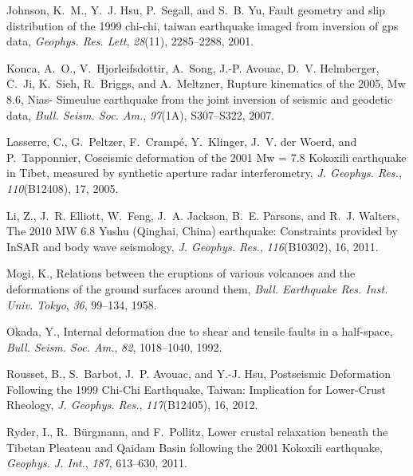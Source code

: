\documentclass[10pt]{article}
\begin{document}
\begin{thebibliography}{30}
Johnson, K.~M., Y.~J. Hsu, P.~Segall, and S.~B. Yu, Fault geometry and slip
  distribution of the 1999 chi-chi, taiwan earthquake imaged from inversion of
  gps data, \textit{Geophys. Res. Lett}, \textit{28}(11), 2285--2288, 2001.

Konca, A.~O., V.~Hjorleifsdottir, A.~Song, J.-P. Avouac, D.~V. Helmberger,
  C.~Ji, K.~Sieh, R.~Briggs, and A.~Meltzner, {Rupture kinematics of the 2005,
  Mw 8.6, Nias- Simeulue earthquake from the joint inversion of seismic and
  geodetic data}, \textit{Bull. Seism. Soc. Am.}, \textit{97}(1A), S307--S322,
  2007.

Lasserre, C., G.~Peltzer, F.~Cramp\'{e}, Y.~Klinger, J.~V. der Woerd, and
  P.~Tapponnier, {Coseismic deformation of the 2001 Mw = 7.8 Kokoxili
  earthquake in Tibet, measured by synthetic aperture radar interferometry},
  \textit{J. Geophys. Res.}, \textit{110}(B12408), 17, 2005.

Li, Z., J.~R. Elliott, W.~Feng, J.~A. Jackson, B.~E. Parsons, and R.~J.
  Walters, {The 2010 MW 6.8 Yushu (Qinghai, China) earthquake: Constraints
  provided by InSAR and body wave seismology}, \textit{J. Geophys. Res.},
  \textit{116}(B10302), 16, 2011.

Mogi, K., Relations between the eruptions of various volcanoes and the
  deformations of the ground surfaces around them, \textit{Bull. Earthquake
  Res. Inst. Univ. Tokyo}, \textit{36}, 99--134, 1958.

Okada, Y., Internal deformation due to shear and tensile faults in a
  half-space, \textit{Bull. Seism. Soc. Am.}, \textit{82}, 1018--1040, 1992.

Rousset, B., S.~Barbot, J.~P. Avouac, and Y.-J. Hsu, {Postseismic Deformation
  Following the 1999 Chi-Chi Earthquake, Taiwan: Implication for Lower-Crust
  Rheology}, \textit{J. Geophys. Res.}, \textit{117}(B12405), 16, 2012.

Ryder, I., R.~B\"{u}rgmann, and F.~Pollitz, {Lower crustal relaxation beneath
  the Tibetan Pleateau and Qaidam Basin following the 2001 Kokoxili
  earthquake}, \textit{Geophys. J. Int.}, \textit{187}, 613--630, 2011.


\end{thebibliography}
\end{document}
